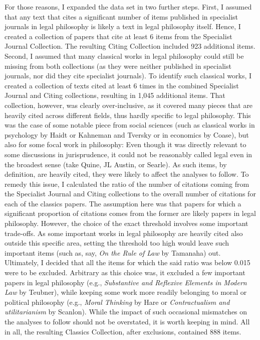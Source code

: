 \documentclass[
]{article}
\begin{document}
For those reasons, I expanded the data set in two further steps. First, I assumed that any text that cites a significant number of items published in specialist journals in legal philosophy is likely a text in legal philosophy itself. Hence, I created a collection of papers that cite at least 6 items from the Specialist Journal Collection. The resulting Citing Collection included 923 additional items. Second, I assumed that many classical works in legal philosophy could still be missing from both collections (as they were neither published in specialist journals, nor did they cite specialist journals). To identify such classical works, I created a collection of texts cited at least 6 times in the combined Specialist Journal and Citing collections, resulting in 1,045 additional items. That collection, however, was clearly over-inclusive, as it covered many pieces that are heavily cited across different fields, thus hardly specific to legal philosophy. This was the case of some notable piece from social sciences (such as classical works in psychology by Haidt or Kahneman and Tversky or in economics by Coase), but also for some focal work in philosophy: Even though it was directly relevant to some discussions in jurisprudence, it could not be reasonably called legal even in the broadest sense (take Quine, JL Austin, or Searle). As such items, by definition, are heavily cited, they were likely to affect the analyses to follow. To remedy this issue, I calculated the ratio of the number of citations coming from the Specialist Journal and Citing collections to the overall number of citations for each of the classics papers. The assumption here was that papers for which a significant proportion of citations comes from the former are likely papers in legal philosophy. However, the choice of the exact threshold involves some important trade-offs. As some important works in legal philosophy are heavily cited also outside this specific area, setting the threshold too high would leave such important items (such as, say, \emph{On the Rule of Law} by Tamanaha) out. Ultimately, I decided that all the items for which the said ratio was below 0.015 were to be excluded. Arbitrary as this choice was, it excluded a few important papers in legal philosophy (e.g., \emph{Substantive and Reflexive Elements in Modern Law} by Teubner), while keeping some work more readily belonging to moral or political philosophy (e.g., \emph{Moral Thinking} by Hare or \emph{Contractualism and utilitarianism} by Scanlon). While the impact of such occasional mismatches on the analyses to follow should not be overstated, it is worth keeping in mind. All in all, the resulting Classics Collection, after exclusions, contained 888 items.
\end{document}
